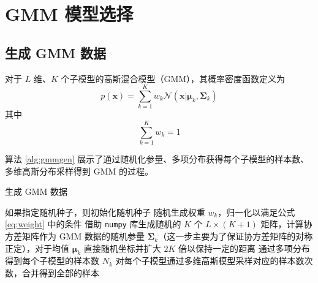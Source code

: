 
    \section{GMM 模型选择}

    \subsection{生成 GMM 数据}\label{sec:datagen}

    对于 $L$ 维、$K$ 个子模型的高斯混合模型（GMM），其概率密度函数定义为
    \begin{equation}
        p(\bm{x}) = \sum_{k=1}^K w_k \mathcal{N}(\bm{x}|\bm{\mu}_k,\bm{\Sigma}_k)
    \end{equation}
    其中
    \begin{equation}\label{eq:weight}
        \sum_{k=1}^K w_k = 1
    \end{equation}

    算法 \ref{alg:gmmgen} 展示了通过随机化参量、多项分布获得每个子模型的样本数、多维高斯分布采样得到 GMM 的过程\cite{gmmgen}。

    \begin{algorithm}
        \caption{生成 GMM 数据}\label{alg:gmmgen}
        如果指定随机种子，则初始化随机种子\;
        随机生成权重 $w_k$，归一化以满足公式 \eqref{eq:weight} 中的条件\;
        借助 \verb"numpy" 库生成随机的 $K$ 个 $L\times (K+1)$ 矩阵，计算协方差矩阵作为 GMM 数据的随机参量 $\bm{\Sigma}_k$（这一步主要为了保证协方差矩阵的对称正定\cite{multinorm}），对于均值 $\bm{\mu}_k$ 直接随机坐标并扩大 $2K$ 倍以保持一定的距离\;
        通过多项分布得到每个子模型的样本数 $N_k$\;
        对每个子模型通过多维高斯模型采样对应的样本数次数，合并得到全部的样本\;
    \end{algorithm}
    

    
